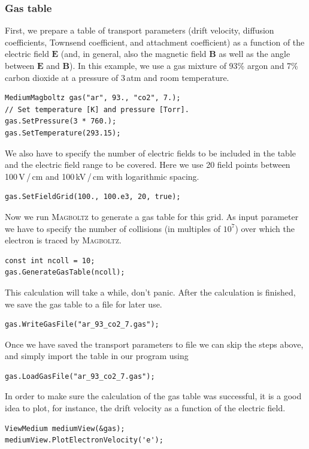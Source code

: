 \subsubsection{Gas table}
First, we prepare a table of transport parameters 
(drift velocity, diffusion coefficients, Townsend coefficient,
and attachment coefficient) as a function 
of the electric field \(\mathbf{E}\)  
(and, in general, also the magnetic field \(\mathbf{B}\) 
as well as the angle between \(\mathbf{E}\) and \(\mathbf{B}\)).
In this example, we use a gas mixture of 93\% argon and 7\% 
carbon dioxide at a pressure of 3\,atm and room temperature.
\begin{lstlisting}
MediumMagboltz gas("ar", 93., "co2", 7.);
// Set temperature [K] and pressure [Torr].
gas.SetPressure(3 * 760.);
gas.SetTemperature(293.15);
\end{lstlisting} 
We also have to specify the number of electric fields to be 
included in the table and the electric field range to be covered. 
Here we use 20 field points between 100\,V\,/\,cm and 100\,kV\,/\,cm 
with logarithmic spacing. 
\begin{lstlisting}
gas.SetFieldGrid(100., 100.e3, 20, true);
\end{lstlisting}
Now we run \textsc{Magboltz} to generate a gas table for this grid. 
As input parameter we have to specify the number of collisions 
(in multiples of \(10^{7}\)) over which the electron is traced 
by \textsc{Magboltz}.
\begin{lstlisting}
const int ncoll = 10;
gas.GenerateGasTable(ncoll);
\end{lstlisting}
This calculation will take a while, don't panic. 
After the calculation is finished, we save the gas table to a 
file for later use.
\begin{lstlisting}
gas.WriteGasFile("ar_93_co2_7.gas");
\end{lstlisting}
Once we have saved the transport parameters to file 
we can skip the steps above, 
and simply import the table in our program using
\begin{lstlisting}
gas.LoadGasFile("ar_93_co2_7.gas");
\end{lstlisting} 

In order to make sure the calculation of the gas table was successful, 
it is a good idea to plot, for instance, 
the drift velocity as a function of the electric field.
\begin{lstlisting}
ViewMedium mediumView(&gas);
mediumView.PlotElectronVelocity('e');
\end{lstlisting}
